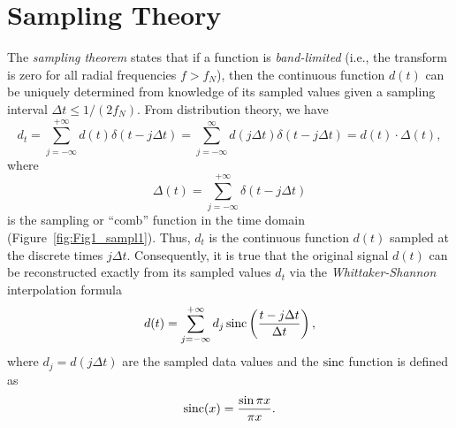 \section{Sampling Theory}

The \emph{sampling theorem} states that if a function is \emph{band-limited} (i.e., the transform is zero for all 
radial frequencies $f > f_N$), then the continuous function $d(t)$ can be uniquely determined from knowledge 
of its sampled values given a sampling interval $\Delta t \leq  1/(2 f_N)$.  From distribution theory, we have
\begin{equation}
d_t = \sum^{+\infty} _{j= - \infty} d(t) \delta (t-j \Delta t) = \sum^\infty _{j= - \infty} 
d(j \Delta t) \delta ( t - j \Delta t) = d(t) \cdot \Delta (t),
\end{equation}
where
\begin{equation}
\Delta (t) = \sum^{+\infty }_{j= - \infty} \delta ( t - j \Delta t)
\end{equation}
is the sampling or ``comb'' function in the time domain (Figure~\ref{fig:Fig1_sampl1}).
Thus, $d_t$ is the continuous function $d(t)$ sampled at the discrete times $j\Delta t$.
Consequently, it is true that the original signal $d(t)$ can be reconstructed exactly from
its sampled values $d_t$ via the \emph{Whittaker-Shannon} interpolation formula
\begin{equation}
	d(t) = \sum_{j=-\infty}^{+\infty} d_j \operatorname{sinc} \left( \frac{t - j\Delta t}{\Delta t} \right),
	\label{eq:WhittakerShannon}
\end{equation}
where $d_j = d(j\Delta t)$ are the sampled data values and the $\operatorname{sinc}$ function is defined as
\begin{equation}
	\operatorname{sinc}(x) =  \frac{\sin \pi x}{\pi x}.
	\label{eq:sincfunction}
\end{equation}


